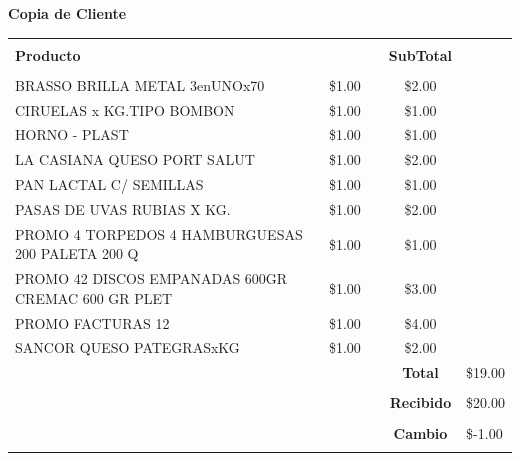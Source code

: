 \documentclass{letter}
\begin{document}
\vspace{1 cm}\Large\textbf{Copia de Cliente}\normalsize
\begin{longtable}{p{7cm} c c c l}
\hline
& & & &\\[0.25ex]
{\bf{Producto}} & \centering{\bf{Precio}} & \centering{\bf{Cantidad}}  & \bf SubTotal\\[2.5ex]\hline
& & & &\\ 
BRASSO BRILLA METAL 3enUNOx70 & \centering\$1.00 & \centering 2 &  \$2.00\\[2.5ex]\hline
 CIRUELAS x KG.TIPO BOMBON & \centering\$1.00 & \centering 1 &  \$1.00\\[2.5ex]\hline
 HORNO - PLAST & \centering\$1.00 & \centering 1 &  \$1.00\\[2.5ex]\hline
 LA CASIANA QUESO PORT SALUT & \centering\$1.00 & \centering 2 &  \$2.00\\[2.5ex]\hline
 PAN LACTAL C/ SEMILLAS & \centering\$1.00 & \centering 1 &  \$1.00\\[2.5ex]\hline
 PASAS DE UVAS RUBIAS X KG. & \centering\$1.00 & \centering 2 &  \$2.00\\[2.5ex]\hline
 PROMO 4 TORPEDOS 4 HAMBURGUESAS 200 PALETA 200 Q & \centering\$1.00 & \centering 1 &  \$1.00\\[2.5ex]\hline
 PROMO 42 DISCOS EMPANADAS 600GR CREMAC 600 GR PLET & \centering\$1.00 & \centering 3 &  \$3.00\\[2.5ex]\hline
 PROMO FACTURAS 12 & \centering\$1.00 & \centering 4 &  \$4.00\\[2.5ex]\hline
 SANCOR QUESO PATEGRASxKG & \centering\$1.00 & \centering 2 &  \$2.00\\[2.5ex]\hline
 & & & \bf Total & \$19.00\\[2.5ex]\hhline{~~~--}
& & & & \\& & & \bf Recibido & \$20.00\\[2.5ex]\hhline{~~~--}
& & & & \\& & & \bf Cambio & \$-1.00\\[2.5ex]\hhline{~~~==}
 \end{longtable} 
\end{document}
